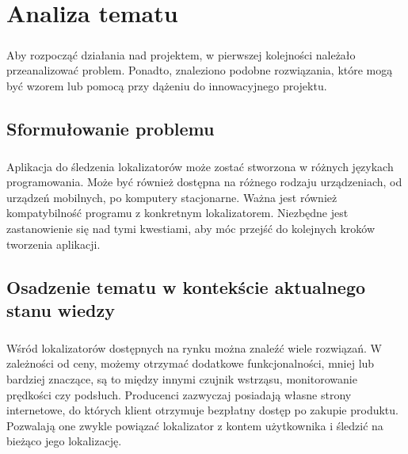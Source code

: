 \chapter{Analiza tematu}

\paragraph{}
Aby rozpocząć działania nad projektem, w pierwszej kolejności należało przeanalizować problem. Ponadto, znaleziono podobne rozwiązania, które mogą być wzorem lub pomocą przy dążeniu do innowacyjnego  projektu.

\section{Sformułowanie problemu}

\paragraph{}
Aplikacja do śledzenia lokalizatorów może zostać stworzona w różnych językach programowania. Może być również dostępna na różnego rodzaju urządzeniach, od urządzeń mobilnych, po komputery stacjonarne. Ważna jest również kompatybilność programu z konkretnym lokalizatorem. Niezbędne jest zastanowienie się nad tymi kwestiami, aby móc przejść do kolejnych kroków tworzenia aplikacji.

\section{Osadzenie tematu w kontekście aktualnego stanu wiedzy}

\paragraph{}
Wśród lokalizatorów dostępnych na rynku można znaleźć wiele rozwiązań. W zależności od ceny, możemy otrzymać dodatkowe funkcjonalności, mniej lub bardziej znaczące, są to między innymi czujnik wstrząsu, monitorowanie prędkości czy podsłuch. Producenci zazwyczaj posiadają własne strony internetowe, do których klient otrzymuje bezpłatny dostęp po zakupie produktu. Pozwalają one zwykle powiązać lokalizator z kontem użytkownika i śledzić na bieżąco jego lokalizację.

